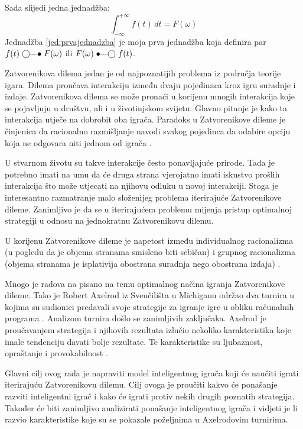 \documentclass[zavrsnirad]{fer}
\begin{document}
Sada slijedi jedna jednadžba:
\begin{equation}
  \label{jed:prvajednadzba}
  \int_{-\infty}^{+\infty}f(t)\,dt=F(\omega)
\end{equation}
Jednadžba \eqref{jed:prvajednadzba} je moja prva jednadžba koja definira par $f(t)\ufrek F(\omega)$ ili $F(\omega)\uvrem f(t)$.

\cite{1980Axelrod1}
\cite{1980Axelrod2}
\cite{igraHrEnc}

\break

	Zatvorenikova dilema jedan je od najpoznatijih problema iz područja teorije igara. Dilema proučava interakciju između dvaju pojedinaca kroz igru suradnje i izdaje. Zatvorenikova dilema se može pronaći u korijenu mnogih interakcija koje se pojavljuju u društvu, ali i u životinjskom svijetu. Glavno pitanje je kako ta interakcija utječe na dobrobit oba igrača. Paradoks u Zatvorenikove dileme je činjenica da racionalno razmišljanje navodi svakog pojedinca da odabire opciju koja ne odgovara niti jednom od igrača \cite{PrisDilemmaHrEnc}.
	
	U stvarnom životu su takve interakcije često ponavljajuće prirode. Tada je potrebno imati na umu da će druga strana vjerojatno imati iskustvo prošlih interakcija što može utjecati na njihovu odluku u novoj interakciji. Stoga je interesantno razmatranje malo složenijeg problema iterirajuće Zatvorenikove dileme. Zanimljivo je da se u iterirajućem problemu mijenja pristup optimalnoj strategiji u odnosu na jednokratnu Zatvorenikovu dilemu.
	
	U korijenu Zatvorenikove dileme je napetost između individualnog racionalizma (u pogledu da je objema stranama smisleno biti sebičan) i grupnog racionalizma (objema stranama je isplativija obostrana suradnja nego obostrana izdaja) \cite{1980Axelrod1}.
	
	Mnogo je radova na pisano na temu optimalnog načina igranja Zatvorenikove dileme. Tako je Robert Axelrod iz Sveučilišta u Michiganu održao dva turnira u kojima su sudionici predavali svoje strategije za igranje igre u obliku računalnih programa \cite{1980Axelrod1} \cite{1980Axelrod2}. Analizom turnira došlo se zanimljivih zaključaka. Axelrod je proučavanjem strategija i njihovih rezultata izlučio nekoliko karakteristika koje imale tendenciju davati bolje rezultate. Te karakteristike su ljubaznost, opraštanje i provokabilnost \cite{1980Axelrod2}.
	
	Glavni cilj ovog rada je napraviti model inteligentnog igrača koji će naučiti igrati iterirajuću Zatvorenikovu dilemu. Cilj ovoga je proučiti kakvo će ponašanje razviti inteligentni igrač i kako će igrati protiv nekih drugih poznatih strategija. Također će biti zanimljivo analizirati ponašanje inteligentnog igrača i vidjeti je li razvio karakteristike koje su se pokazale poželjnima u Axelrodovim turnirima.
\end{document}

